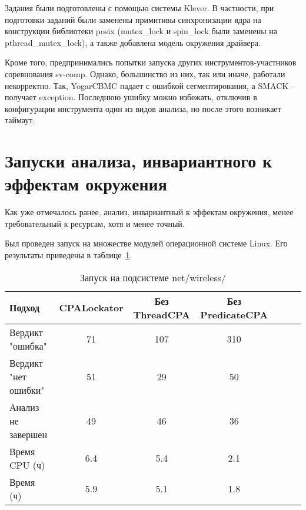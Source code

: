 Задания были подготовлены с помощью системы Klever. В частности, при подготовки заданий были заменены примитивы синхронизации ядра на конструкции библиотеки posix (mutex\_lock и spin\_lock были заменены на pthread\_mutex\_lock), а также добавлена модель окружения драйвера.

Кроме того, предпринимались попытки запуска других инструментов-участников соревнования sv-comp. 
Однако, большинство из них, так или иначе, работали некорректно. 
Так, YogarCBMC падает с ошибкой сегментирования, а SMACK -- получает exception. Последнюю ушибку можно избежать, отключив в конфигурации инструмента один из видов анализа, но после этого возникает таймаут.


\section{Запуски анализа, инвариантного к эффектам окружения}

Как уже отмечалось ранее, анализ, инвариантный к эффектам окружения, менее требовательный к ресурсам, хотя и менее точный.

Был проведен запуск на множестве модулей операционной системе Linux. Его результаты приведены в таблице~\ref{table-linux-full}.

\begin{center}
  \begin{table}[h]\footnotesize
    \caption{Запуск на подсистеме net/wireless/}
    \label{table-linux-full}
    \begin{tabular}{ | l | c | c | c | c | c | c |}
      \hline
      Подход         & CPALockator   & Без ThreadCPA & Без PredicateCPA \\ \hline
      Вердикт "ошибка" & 71    & 107        & 310 \\ 
      Вердикт "нет ошибки"  & 51      & 29        & 50  \\ 
      Анализ не завершен       & 49     & 46         & 36    \\ \hline
      Время CPU (ч)   & 6.4 & 5.4     & 2.1  \\ 
      Время (ч)  & 5.9 & 5.1     & 1.8   \\
      \hline
    \end{tabular}
  \end{table}
\end{center}

